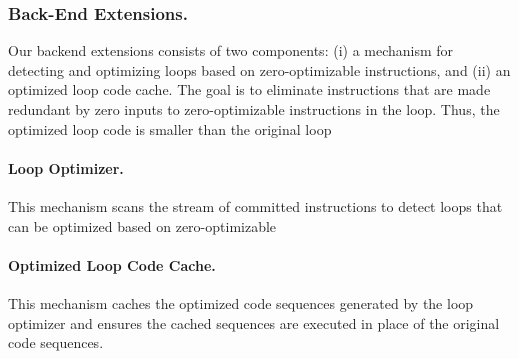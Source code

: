  
 
 \subsubsection{Back-End Extensions.}
 Our backend extensions consists of two components: (i) a mechanism for detecting and optimizing loops based on zero-optimizable instructions, and (ii) an optimized loop code cache.  The goal is to eliminate instructions that are made redundant by zero inputs to zero-optimizable instructions in the loop.  Thus, the optimized loop code is smaller than the original loop 
 
 \paragraph{Loop Optimizer.} This mechanism scans the stream of committed instructions to detect loops that can be optimized based on zero-optimizable 
 
 \paragraph{Optimized Loop Code Cache.} This mechanism caches the optimized code sequences generated by the loop optimizer and ensures the cached sequences are executed in place of the original code sequences.   
 
 
